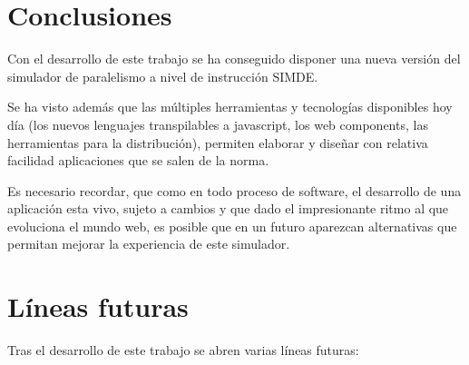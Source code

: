 \section{Conclusiones}
\label{7:sec1}

Con el desarrollo de este trabajo se ha conseguido disponer una nueva versión
del simulador de paralelismo a nivel de instrucción SIMDE. \cite{NuevaURLSimde}

Se ha visto además que las múltiples herramientas y tecnologías disponibles hoy
día (los nuevos lenguajes transpilables a javascript, los web components, las 
herramientas para la distribución), permiten elaborar y diseñar con relativa
facilidad aplicaciones que se salen de la norma.

Es necesario recordar, que como en todo proceso de software, el desarrollo de una 
aplicación esta vivo, sujeto a cambios y que dado el impresionante ritmo al que evoluciona
el mundo web, es posible que en un futuro aparezcan alternativas que permitan mejorar 
la experiencia de este simulador.

\section{Líneas futuras}
\label{7:sec2}

Tras el desarrollo de este trabajo se abren varias líneas futuras: 

